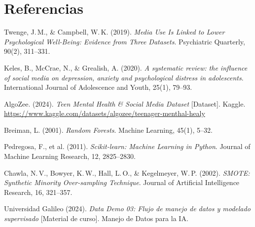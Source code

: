 \documentclass[11pt,twocolumn]{article}
\begin{document}
\section*{Referencias}

\begin{enumerate}[leftmargin=14pt, itemsep=2pt, parsep=0pt,
                  label={[\arabic*]}]

  \item Twenge, J.\,M., \& Campbell, W.\,K. (2019). \textit{Media Use
        Is Linked to Lower Psychological Well-Being: Evidence from Three
        Datasets}. Psychiatric Quarterly, 90(2), 311--331.

  \item Keles, B., McCrae, N., \& Grealish, A. (2020). \textit{A
        systematic review: the influence of social media on depression,
        anxiety and psychological distress in adolescents}. International
        Journal of Adolescence and Youth, 25(1), 79--93.

  \item AlgoZee. (2024). \textit{Teen Mental Health \& Social Media
        Dataset} [Dataset]. Kaggle.
        \url{https://www.kaggle.com/datasets/algozee/teenager-menthal-healy}

  \item Breiman, L. (2001). \textit{Random Forests}.
        Machine Learning, 45(1), 5--32.

  \item Pedregosa, F., et al. (2011). \textit{Scikit-learn: Machine
        Learning in Python}. Journal of Machine Learning Research,
        12, 2825--2830.

  \item Chawla, N.\,V., Bowyer, K.\,W., Hall,
        L.\,O., \& Kegelmeyer, W.\,P. (2002). \textit{SMOTE: Synthetic
        Minority Over-sampling Technique}. Journal of Artificial
        Intelligence Research, 16, 321--357.

  \item Universidad Galileo (2024). \textit{Data
        Demo 03: Flujo de manejo de datos y modelado supervisado}
        [Material de curso]. Manejo de Datos para la IA.

\end{enumerate}
\end{document}
